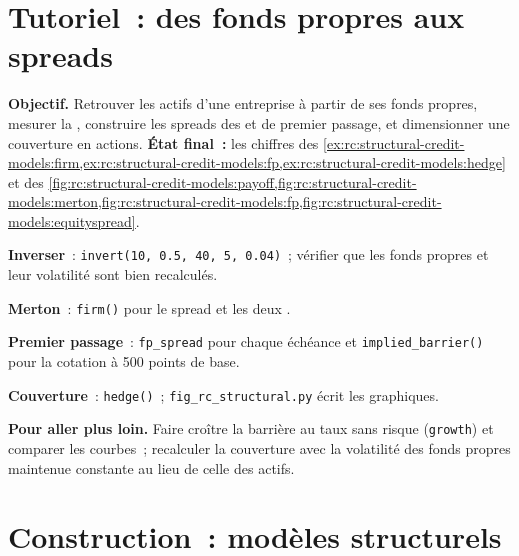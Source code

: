 \section{Tutoriel~: des fonds propres aux spreads}\label{tut:rc:structural-credit-models:tutorial}

\begin{tutorial}
\textbf{Objectif.} Retrouver les actifs d'une entreprise à partir de ses fonds propres, mesurer la ,
construire les spreads des  et de premier passage, et dimensionner une couverture en actions.
\textbf{État final~:} les chiffres des
\cref{ex:rc:structural-credit-models:firm,ex:rc:structural-credit-models:fp,ex:rc:structural-credit-models:hedge}
et des \cref{fig:rc:structural-credit-models:payoff,fig:rc:structural-credit-models:merton,fig:rc:structural-credit-models:fp,fig:rc:structural-credit-models:equityspread}.
\begin{tutsteps}
\item \textbf{Inverser}~: \texttt{invert(10, 0.5, 40, 5, 0.04)}~; vérifier que les fonds propres et leur volatilité
sont bien recalculés.
\item \textbf{Merton}~: \texttt{firm()} pour le spread et les deux .
\item \textbf{Premier passage}~: \texttt{fp\_spread} pour chaque échéance et
\texttt{implied\_barrier()} pour la cotation à 500 points de base.
\item \textbf{Couverture}~: \texttt{hedge()}~; \texttt{fig\_rc\_structural.py} écrit les graphiques.
\end{tutsteps}
\textbf{Pour aller plus loin.} Faire croître la barrière au taux sans risque
(\texttt{growth}) et comparer les courbes~; recalculer la couverture avec la volatilité des fonds propres
maintenue constante au lieu de celle des actifs.
\end{tutorial}

\section{Construction~: modèles structurels}\label{bld:rc:structural-credit-models:structural}


